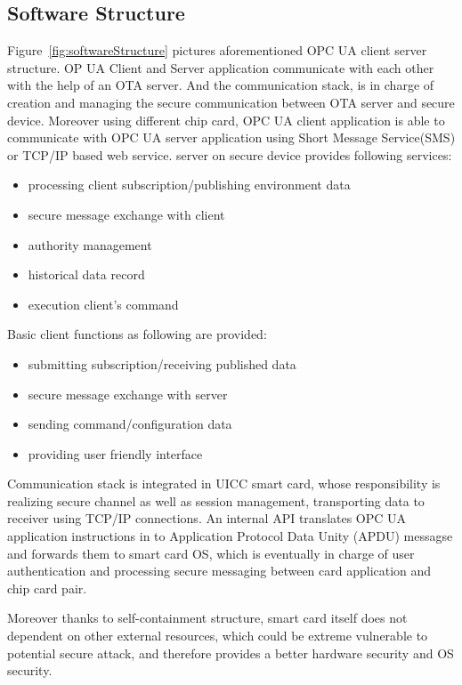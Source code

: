 \documentclass[]{llncs}
\begin{document}
\subsection {Software Structure}
Figure~\ref{fig:softwareStructure} pictures aforementioned OPC UA client server structure. OP UA Client and Server application communicate with each other with the help of an OTA server. And the communication stack,  is in charge of creation and managing the secure communication between OTA server and secure device. Moreover using different chip card, OPC UA client application is able to communicate with OPC UA server application using Short Message Service(SMS) or TCP/IP based web service. 
\newline
server on secure device provides following services:
 \begin{itemize}
  \item processing client subscription/publishing environment data
  \item secure message exchange with client
  \item authority management
  \item historical data record
  \item execution client's command
\end{itemize}
Basic client functions as following are provided:
 \begin{itemize}
  \item submitting subscription/receiving published data
  \item secure message exchange with server
  \item sending command/configuration data
  \item providing user friendly interface
\end{itemize}

Communication stack is integrated  in UICC smart card, whose responsibility is realizing secure channel as well as session management, transporting data to receiver using TCP/IP connections. An internal API translates OPC UA application instructions in to Application Protocol Data Unity (APDU) messagse and forwards them to smart card OS, which is eventually in charge of user authentication and processing secure messaging between card application and chip card pair. 

Moreover thanks to self-containment structure, smart card itself does not dependent on other external resources, which could be extreme vulnerable to potential secure attack, and therefore provides a better hardware security and OS security.
\end{document}
